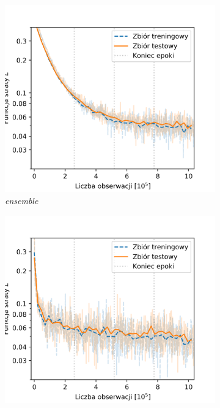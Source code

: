 \documentclass{pracalicmgr}
\begin{document}
	\begin{figure}
	\begin{subfigure}{.5\textwidth}
	\centering
	\includegraphics[width=1\textwidth]{loss_ensemble.png}
	\caption{\textit{ensemble}}
	\end{subfigure}
	\begin{subfigure}{.5\textwidth}
	\centering
	\includegraphics[width=1\textwidth]{loss_baseline.png}

\end{subfigure}
\end{figure}
\end{document}
